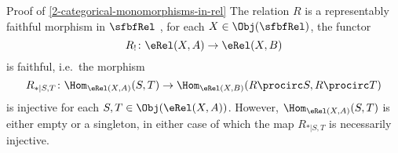\begin{Proof}{Proof of \cref{2-categorical-monomorphisms-in-rel}}%
    The relation $R$ is a representably faithful morphism in $\sfbfRel$ \textiff, for each $X\in\Obj(\sfbfRel)$, the functor
    \[
        R_{!}%
        \colon%
        \eRel(X,A)%
        \to%
        \eRel(X,B)%
    \]%
    is faithful, i.e.\ \textiff the morphism
    \[
        R_{*|S,T}%
        \colon%
        \Hom_{\eRel(X,A)}(S,T)%
        \to%
        \Hom_{\eRel(X,B)}(R\procirc S,R\procirc T)%
    \]%
    is injective for each $S,T\in\Obj(\eRel(X,A))$. However, $\Hom_{\eRel(X,A)}(S,T)$ is either empty or a singleton, in either case of which the map $R_{*|S,T}$ is necessarily injective.


\end{Proof}
